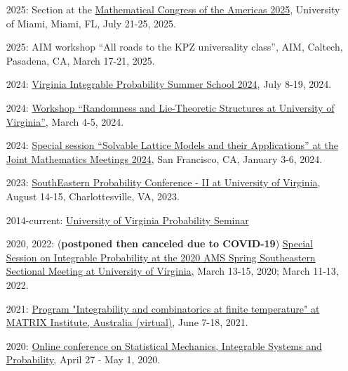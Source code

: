\documentclass[letterpaper,11pt]{article}
\begin{document}
\begin{itemize}
	\item [2025:] 
	Section at the
	\href{https://www.math.miami.edu/mca/}{Mathematical Congress of the Americas 2025},
	University of Miami,
	Miami, FL,
	July 21-25, 2025.

	\item [2025:] 
	AIM workshop 
	``All roads to the KPZ universality class'', 
	AIM, Caltech, Pasadena, CA, March 17-21, 2025.

	\item [2024:] 
	\href{https://lpetrov.cc/vipss2024/}{Virginia Integrable Probability Summer School 2024},
	July 8-19, 2024.

	\item [2024:] 
	\href{https://math.virginia.edu/random-lie-2024/}{Workshop ``Randomness and Lie-Theoretic Structures at University of Virginia''},
	March 4-5, 2024.

	\item [2024:] 
\href{https://www.jointmathematicsmeetings.org/meetings/national/jmm2024/2300_program_ss43.html}{Special session ``Solvable Lattice Models and their Applications'' at the Joint Mathematics Meetings 2024},
San Francisco, CA, January 3-6, 2024.

\item [2023:] 
\href{https://sites.google.com/view/sepc2023ii/sepc-2023-ii}{SouthEastern Probability Conference - II at University of Virginia},
August 14-15, Charlottesville, VA, 2023.

\item [2014-current:] 
\href{http://math.virginia.edu/seminars/probability/}{University of Virginia Probability Seminar}

\item [2020, 2022:]
(\textbf{postponed then canceled due to COVID-19})
\href{http://www.ams.org/meetings/sectional/2273_program.html}{Special Session on Integrable Probability at the 2020 AMS Spring Southeastern Sectional Meeting at University of Virginia},
March 13-15, 2020; March 11-13, 2022.

\item [2021:]
\href{https://www.matrix-inst.org.au/events/integrability-and-combinatorics-at-finite-temperature/}{Program "Integrability and combinatorics at finite temperature" at MATRIX Institute, Australia (virtual)},
June 7-18, 2021.

\item [2020:]
\href{http://mtikhonov.com/smisp/}{Online conference on Statistical Mechanics, Integrable Systems and Probability},
April 27 - May 1, 2020.


\end{itemize}
\end{document}
